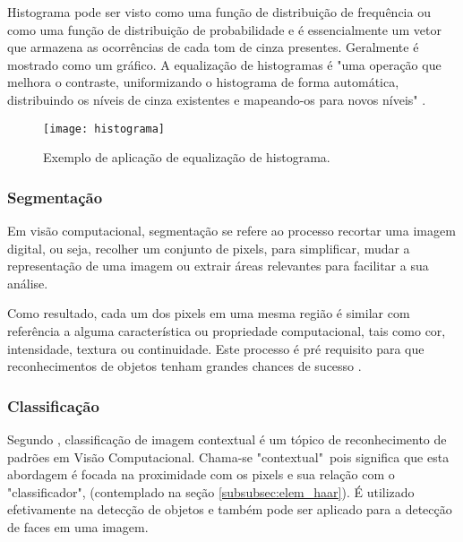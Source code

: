 Histograma pode ser visto como uma função de distribuição de frequência ou como uma função de distribuição de probabilidade e é essencialmente um vetor que armazena as ocorrências de cada tom de cinza presentes. Geralmente é mostrado como um gráfico. A equalização de histogramas é "uma operação que melhora o contraste, uniformizando o histograma de forma automática, distribuindo os níveis de cinza existentes e mapeando-os para novos níveis" \cite{gabriel_histograma}.

\begin{figure}[h]
	\centering
	\texttt{[image: histograma]}
	\caption{Exemplo de aplicação de equalização de  histograma.}
	\label{fig:histograma}
\end{figure}



\subsubsection{Segmentação}\label{subsubsec:segmentacao}

Em visão computacional, segmentação se refere ao processo recortar uma imagem digital, ou seja, recolher um conjunto de pixels, para simplificar, mudar a representação de uma imagem ou extrair áreas relevantes para facilitar a sua análise. 

Como resultado, cada um dos pixels em uma mesma região é similar com referência a alguma característica ou propriedade computacional, tais como cor, intensidade, textura ou continuidade. Este processo é pré requisito para que reconhecimentos de objetos tenham grandes chances de sucesso \cite{gonzalez_woods}.

\subsubsection{Classificação}\label{subsubsec:classificacao}

Segundo \cite{edinburgh_classifier}, classificação de imagem contextual é um tópico de reconhecimento de padrões em  Visão Computacional. Chama-se "contextual"\ pois significa que esta abordagem é focada na proximidade com os pixels e sua relação com o "classificador", (contemplado na seção \autoref{subsubsec:elem_haar}). É utilizado efetivamente na detecção de objetos e também pode ser aplicado para a detecção de faces em uma imagem.




